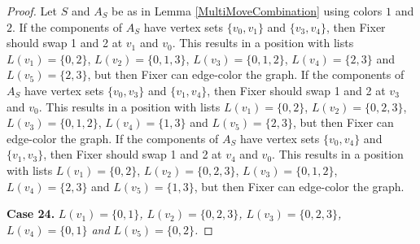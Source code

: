 \documentclass[12pt]{amsart}
\theoremstyle{plain}
\theoremstyle{definition}
\theoremstyle{remark}
\begin{document}
\begin{proof}
Let $S$ and $A_S$ be as in Lemma \ref{MultiMoveCombination} using colors $1$ and $2$. If the components of $A_S$ have vertex sets $\{v_0, v_1\}$ and $\{v_3, v_4\}$, then Fixer should swap 1 and 2 at $v_1$ and $v_0$. This results in a position with lists $L(v_1) = \{0, 2\}$, $L(v_2) = \{0, 1, 3\}$, $L(v_3) = \{0, 1, 2\}$, $L(v_4) = \{2, 3\}$ and $L(v_5) = \{2, 3\}$, but then Fixer can edge-color the graph.
If the components of $A_S$ have vertex sets $\{v_0, v_3\}$ and $\{v_1, v_4\}$, then Fixer should swap 1 and 2 at $v_3$ and $v_0$. This results in a position with lists $L(v_1) = \{0, 2\}$, $L(v_2) = \{0, 2, 3\}$, $L(v_3) = \{0, 1, 2\}$, $L(v_4) = \{1, 3\}$ and $L(v_5) = \{2, 3\}$, but then Fixer can edge-color the graph.
If the components of $A_S$ have vertex sets $\{v_0, v_4\}$ and $\{v_1, v_3\}$, then Fixer should swap 1 and 2 at $v_4$ and $v_0$. This results in a position with lists $L(v_1) = \{0, 2\}$, $L(v_2) = \{0, 2, 3\}$, $L(v_3) = \{0, 1, 2\}$, $L(v_4) = \{2, 3\}$ and $L(v_5) = \{1, 3\}$, but then Fixer can edge-color the graph.

\noindent\textbf{Case 24.  }\textit{$L(v_1) = \{0, 1\}$, $L(v_2) = \{0, 2, 3\}$, $L(v_3) = \{0, 2, 3\}$, $L(v_4) = \{0, 1\}$ and $L(v_5) = \{0, 2\}$.}


\end{proof}
\end{document}
